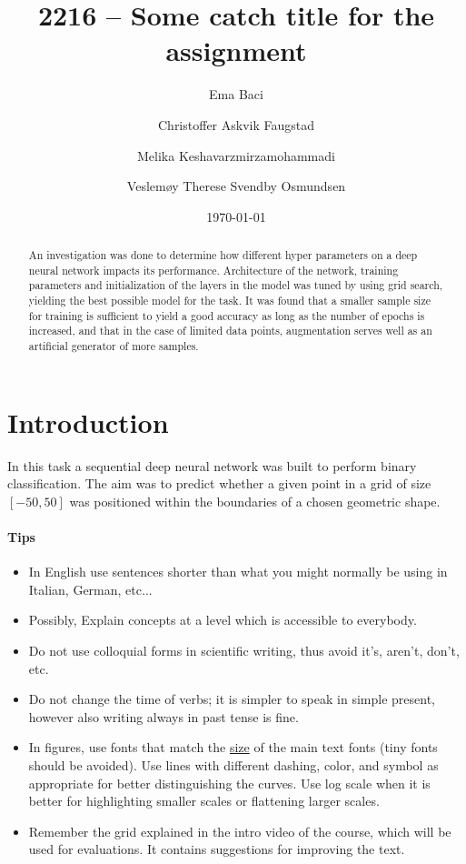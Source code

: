 \documentclass[prl,twocolumn]{revtex4-1}
\begin{document}
\title{2216 -- Some catch title for the assignment}



\author{Ema Baci}
\author{Christoffer Askvik Faugstad}
\author{Melika Keshavarzmirzamohammadi}
\author{Veslemøy Therese Svendby Osmundsen}

\date{\today}


\begin{abstract}
An investigation was done to determine how different hyper parameters on a deep neural network impacts its performance. Architecture of the network, training parameters and initialization of the layers in the model was tuned by using grid search, yielding the best possible model for the task. It was found that a smaller sample size for training is sufficient to yield a good accuracy as long as the number of epochs is increased, and that in the case of limited data points, augmentation serves well as an artificial generator of more samples.
\end{abstract}

\maketitle

\section{Introduction}
In this task a sequential deep neural network was built to perform binary classification. The aim was to predict whether a given point in a grid of size $\left[-50,50\right]$ was positioned within the boundaries of a chosen geometric shape.



\paragraph{\bf Tips}
\begin{itemize}
\item In English use sentences shorter than what you might normally be using in Italian, German, etc...
\item Possibly, Explain concepts at a level which is accessible to everybody.
\item Do not use colloquial forms in scientific writing, thus avoid it's, aren't, don't, etc.
\item Do not change the time of verbs; it is simpler to speak in simple present, however also writing always in past tense is fine.
\item In figures, use fonts that match the \underline{size} of the main text fonts (tiny fonts should be avoided). Use lines with different dashing, color, and symbol as appropriate for better distinguishing the curves. Use log scale when it is better for highlighting smaller scales or flattening larger scales. 
\item Remember the grid explained in the intro video of the course, which will be used for evaluations. It contains suggestions for improving the text.
\end{itemize}
\end{document}
